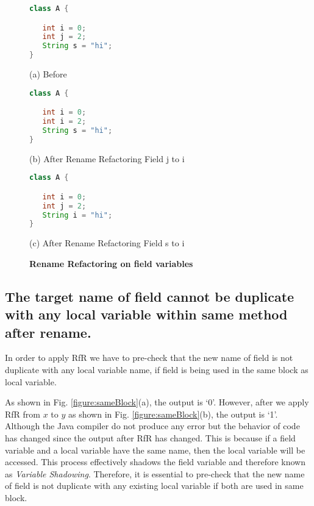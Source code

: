 \begin{figure}[th]
\centering	
\begin{minipage}[t]{0.45\linewidth}
\begin{lstlisting}[language=java, basicstyle=\scriptsize\ttfamily,frame=single]
class A {

   int i = 0;
   int j = 2;
   String s = "hi";
}

\end{lstlisting}
\centering(a) Before
\end{minipage}
\hfill
\begin{minipage}[t]{0.45\linewidth}
\begin{lstlisting}[language=java, basicstyle=\scriptsize\ttfamily,frame=single]
class A {

   int i = 0;
   int i = 2;
   String s = "hi";
}
\end{lstlisting}
\centering(b) After Rename Refactoring Field j to i
\end{minipage}

\centering
\begin{minipage}[t]{0.45\linewidth}
\begin{lstlisting}[language=java, basicstyle=\scriptsize\ttfamily,frame=single]
class A {

   int i = 0;
   int j = 2;
   String i = "hi";
}
\end{lstlisting}
\centering(c) After Rename Refactoring Field s to i
\end{minipage}
\caption{\textbf{Rename Refactoring on field variables}}
\label{figure:field}
\end{figure}


\subsection{The target name of field cannot be duplicate with any local variable within same method after rename.}
In order to apply RfR we have to pre-check that the new name of field is not duplicate with any local variable name, if field is being used in the same block as local variable. 

As shown in Fig. \ref{figure:sameBlock}(a), the output is `0'. However, after we apply RfR from $x$ to $y$ as shown in Fig. \ref{figure:sameBlock}(b), the output is `1'. Although the Java compiler do not produce any error but the behavior of code has changed since the output after RfR has changed. This is because if a field variable and a local variable have the same name, then the local variable will be accessed. This process effectively shadows the field variable and therefore known as \textit{Variable Shadowing}. Therefore, it is essential to pre-check that the new name of field is not duplicate with any existing local variable if both are used in same block.
 

